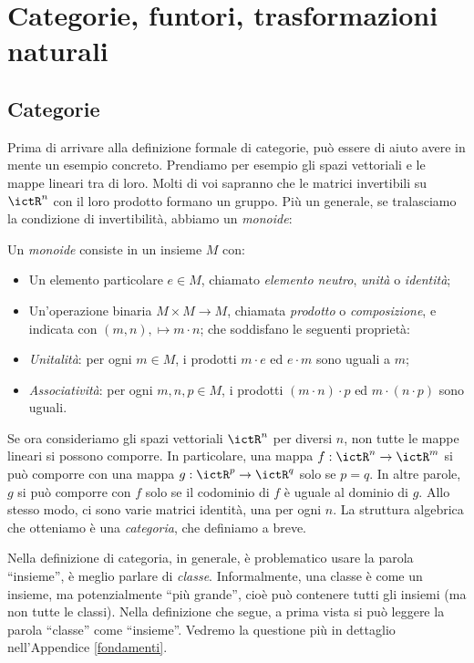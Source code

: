 \chapter{Categorie, funtori, trasformazioni naturali}

\section{Categorie}

Prima di arrivare alla definizione formale di categorie, può essere di aiuto avere in mente un esempio concreto. Prendiamo per esempio gli spazi vettoriali e le mappe lineari tra di loro. 
Molti di voi sapranno che le matrici invertibili su $\ictR^n$ con il loro prodotto formano un gruppo. Più un generale, se tralasciamo la condizione di invertibilità, abbiamo un \emph{monoide}:

\begin{definition}
 Un \emph{monoide} consiste in un insieme $M$ con:
 \begin{itemize}
  \item Un elemento particolare $e\in M$, chiamato \emph{elemento neutro}, \emph{unità} o \emph{identità};
  \item Un'operazione binaria $M\times M\to M$, chiamata \emph{prodotto} o \emph{composizione}, e indicata con $(m,n),\mapsto m\cdot n$;
  che soddisfano le seguenti proprietà:
  \item \emph{Unitalità}: per ogni $m\in M$, i prodotti $m \cdot e$ ed $e\cdot m$ sono uguali a $m$;
  \item \emph{Associatività}: per ogni $m,n,p\in M$, i prodotti $(m\cdot n)\cdot p$ ed $m\cdot (n\cdot p)$ sono uguali. 
 \end{itemize}
\end{definition}

Se ora consideriamo gli spazi vettoriali $\ictR^n$ per diversi $n$, non tutte le mappe lineari si possono comporre. In particolare, una mappa $f:\ictR^n\to \ictR^m$ si può comporre con una mappa $g:\ictR^p\to\ictR^q$ solo se $p=q$. In altre parole, $g$ si può comporre con $f$ solo se il codominio di $f$ è uguale al dominio di $g$.
Allo stesso modo, ci sono varie matrici identità, una per ogni $n$. 
La struttura algebrica che otteniamo è una \emph{categoria}, che definiamo a breve.

Nella definizione di categoria, in generale, è problematico usare la parola ``insieme'', è meglio parlare di \emph{classe}. Informalmente, una classe è come un insieme, ma potenzialmente ``più grande'', cioè può contenere tutti gli insiemi (ma non tutte le classi). 
Nella definizione che segue, a prima vista si può leggere la parola ``classe'' come ``insieme''. Vedremo la questione più in dettaglio nell'Appendice \ref{fondamenti}. 

